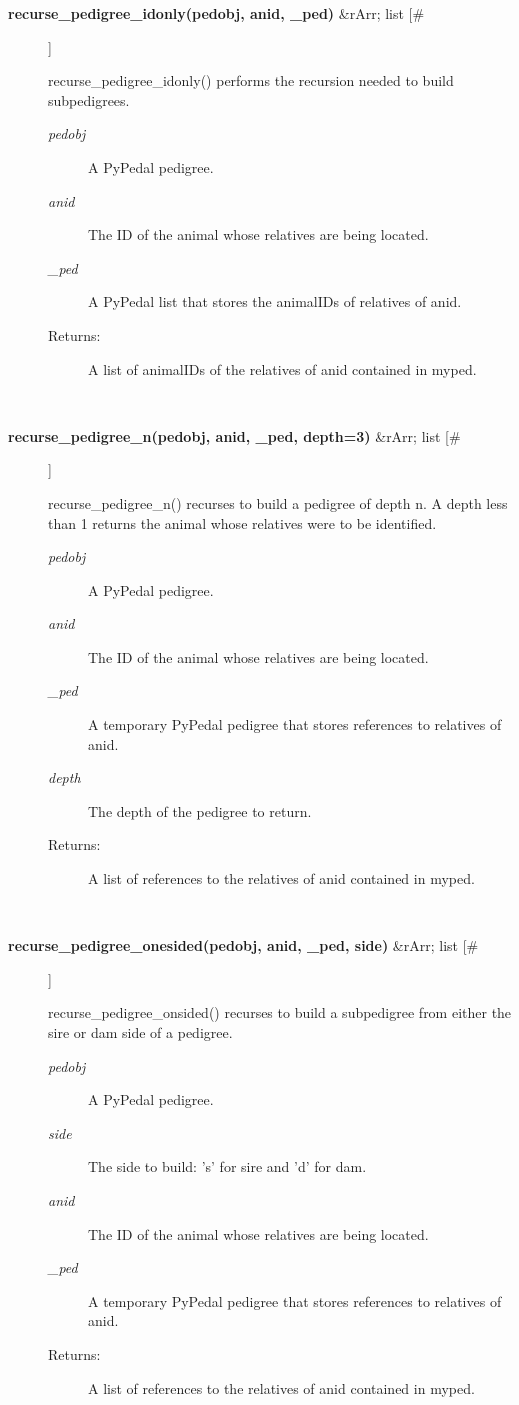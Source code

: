 \documentclass[10pt]{article}
\begin{document}
\begin{description}
\item[\textbf{recurse\_pedigree\_idonly(pedobj, anid, \_ped)}
 \&rArr; list [\#]]

 recurse\_pedigree\_idonly() performs the recursion needed to build subpedigrees.
\begin{description}
\item[\emph{pedobj}
] A PyPedal pedigree.
\item[\emph{anid}
] The ID of the animal whose relatives are being located.
\item[\emph{\_ped}
] A PyPedal list that stores the animalIDs of relatives of anid.
\item[Returns:] A list of animalIDs of the relatives of anid contained in myped.

\end{description}
\\ 

\item[\textbf{recurse\_pedigree\_n(pedobj, anid, \_ped, depth=3)}
 \&rArr; list [\#]]

 recurse\_pedigree\_n() recurses to build a pedigree of depth n. A depth less than 1 returns the animal whose relatives were to be identified.
\begin{description}
\item[\emph{pedobj}
] A PyPedal pedigree.
\item[\emph{anid}
] The ID of the animal whose relatives are being located.
\item[\emph{\_ped}
] A temporary PyPedal pedigree that stores references to relatives of anid.
\item[\emph{depth}
] The depth of the pedigree to return.
\item[Returns:] A list of references to the relatives of anid contained in myped.

\end{description}
\\ 

\item[\textbf{recurse\_pedigree\_onesided(pedobj, anid, \_ped, side)}
 \&rArr; list [\#]]

 recurse\_pedigree\_onsided() recurses to build a subpedigree from either the sire or dam side of a pedigree.
\begin{description}
\item[\emph{pedobj}
] A PyPedal pedigree.
\item[\emph{side}
] The side to build: 's' for sire and 'd' for dam.
\item[\emph{anid}
] The ID of the animal whose relatives are being located.
\item[\emph{\_ped}
] A temporary PyPedal pedigree that stores references to relatives of anid.
\item[Returns:] A list of references to the relatives of anid contained in myped.

\end{description}
\\ 


\end{description}
\end{document}
